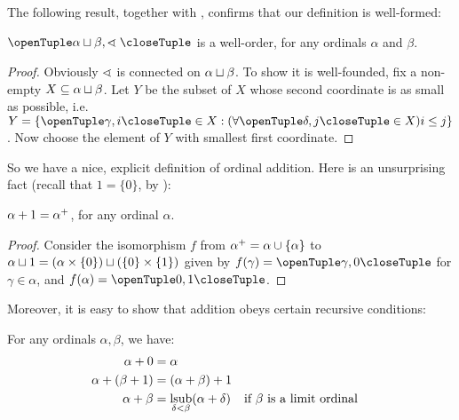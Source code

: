 \documentclass[../../../include/open-logic-section]{subfiles}
\begin{document}
The following result, together with
, confirms that our
definition is well-formed:

\begin{lem} 
$\tuple{\alpha \disjointsum \beta, \rlexless}$ is a well-order, for
any ordinals $\alpha$ and $\beta$.
\end{lem}

\begin{proof}
Obviously $\mathrel{\sphericalangle}$ is connected on $\alpha \sqcup \beta$. To
show it is well-founded, fix a non-empty $X \subseteq \alpha
\sqcup \beta$. Let $Y$ be the subset of $X$ whose second coordinate is as small as possible, i.e.\ $Y = \Setabs{\tuple{\gamma, i} \in X}{(\forall \tuple{\delta, j} \in X)i \leq j}$. Now choose the element of $Y$ with smallest first coordinate. 
\end{proof}
\noindent 
So we have a nice, explicit definition of ordinal addition. Here is
an unsurprising fact (recall that  $1 = \{0\}$, by
):
\begin{prop}
$\alpha +  1 = \alpha^{+}$, for any ordinal $\alpha$.
\end{prop}

\begin{proof}
Consider the isomorphism $f$ from $\alpha^{+} = \alpha \cup
\{\alpha\}$ to $\alpha\sqcup1 = (\alpha \times \{0\})
\sqcup (\{0\} \times \{1\})$ given by $f(\gamma) =
\tuple{\gamma, 0}$ for $\gamma \in \alpha$, and $f(\alpha) = \tuple{0,
1}$.
\end{proof}
\noindent
Moreover, it is easy to show that addition obeys certain recursive
conditions:

\begin{lem}
For any ordinals $\alpha, \beta$, we have:
\begin{align*}
	\alpha+ 0 &= \alpha\\
	\alpha +  (\beta+ 1) &= (\alpha +  \beta) +  1\\
	\alpha  +  \beta &= \operatorname*{\mathrm{lsub}}_{\delta < \beta}(\alpha +  \delta) && \text{if $\beta $ is a limit ordinal}
\end{align*}
\end{lem}
\end{document}

